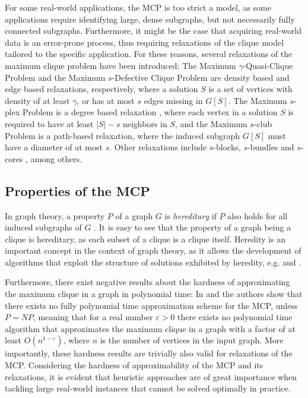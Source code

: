 \documentclass[draft,final]{vutinfth} %
\begin{document}
For some real-world applications, the MCP is too strict a model, as some applications require identifying large, dense subgraphs, but not necessarily fully connected subgraphs. 
Furthermore, it might be the case that acquiring real-world data is an error-prone process, thus requiring relaxations of the clique model tailored to the specific application. 
For these reasons, several relaxations of the maximum clique problem have been introduced: The Maximum $\gamma$-Quasi-Clique Problem \cite{Abello2002} and the Maximum $s$-Defective Clique Problem \cite{Yu2006} are density based and edge based relaxations, respectively, where a solution $S$ is a set of vertices with density of at least $\gamma$, or has at most $s$ edges missing in $G[S]$. 
The Maximum $s$-plex Problem is a degree based relaxation \cite{Seidman1978}, where each vertex in a solution $S$ is required to have at least $|S| - s$ neighbors in $S$, and the Maximum $s$-club Problem \cite{Mokken1979} is a path-based relaxation, where the induced subgraph $G[S]$ must have a diameter of at most $s$. Other relaxations include $s$-blocks, $s$-bundles and $s$-cores \cite{Gschwind2015}, among others. 

\subsection{Properties of the MCP}

In graph theory, a property $P$ of a graph $G$ is \textit{hereditary} if $P$ also holds for all induced subgraphs of $G$ \cite{pattillo_maximum_2013}. It is easy to see that the property of a graph being a clique is hereditary, as each subset of a clique is a clique itself. Heredity is an important concept in the context of graph theory, as it allows the development of algorithms that exploit the structure of solutions exhibited by heredity, e.g. \cite{Trukhanov2013} and \cite{GSCHWIND2018131}.  

Furthermore, there exist negative results about the hardness of approximating the maximum clique in a graph in polynomial time: In \cite{Hastad1999} and \cite{Zuckerman2007} the authors show that there exists no fully polynomial time approximation scheme for the MCP, unless $\mathit{P} = \mathit{NP}$, meaning that for a real number $\varepsilon > 0$ there exists no polynomial time algorithm that approximates the maximum clique in a graph with a factor of at least $O(n^{1-\varepsilon})$, where $n$ is the number of vertices in the input graph. More importantly, these hardness results are trivially also valid for relaxations of the MCP. Considering the hardness of approximability of the MCP and its relaxations, it is evident that heuristic approaches are of great importance when tackling large real-world instances that cannot be solved optimally in practice. 
\end{document}
